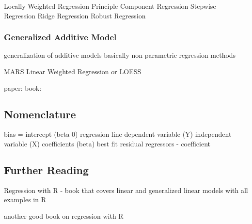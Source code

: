 \begin{bibunit}
Locally Weighted Regression
Principle Component Regression
Stepwise Regression
Ridge Regression
Robust Regression

\subsubsection{Generalized Additive Model}
generalization of additive models
basically non-parametric regression methods

MARS
Linear Weighted Regression or LOESS

paper: \cite{Hastie1986}
book: \cite{Hastie1990}



\subsection{Nomenclature}

bias = intercept (beta 0)
regression line
dependent variable (Y)
independent variable (X)
coefficients (beta)
best fit
residual
regressors - coefficient


\subsection{Further Reading}


Regression with R - book that covers linear and generalized linear models with all examples in R \cite{Weisberg2010}

another good book on regression with R \cite{Sheather2009}



\putbib
\end{bibunit}

\newpage\begin{bibunit}\putbib\end{bibunit}
\newpage\begin{bibunit}\putbib\end{bibunit}
\newpage\begin{bibunit}\putbib\end{bibunit}
\newpage\begin{bibunit}\putbib\end{bibunit}
\newpage\begin{bibunit}\putbib\end{bibunit}

